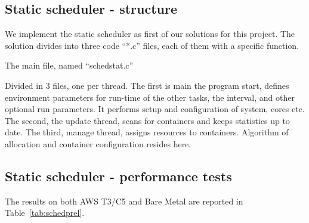 \documentclass[]{scrartcl}
\begin{document}

\subsection{Static scheduler - structure}

We implement the static scheduler as first of our solutions for this project. The solution divides into three code ``*.c'' files, each of them with a specific function. 

The main file, named ``schedstat.c''

Divided in 3 files, one per thread. 
The first is main the program start, defines environment parameters for run-time of the other tasks, the interval, and other optional run parameters. 
It performs setup and configuration of system, cores etc.
The second, the update thread, scans for containers and keeps statistics up to date.
The third, manage thread, assigns resources to containers. Algorithm of allocation and container configuration resides here.

\subsection{Static scheduler - performance tests}

The results on both AWS T3/C5 and Bare Metal are reported in Table~\ref{tab:schedprel}.
\end{document}
